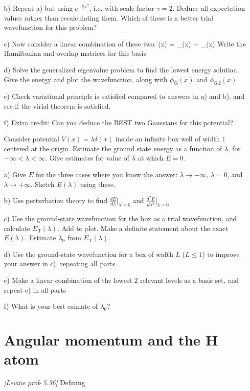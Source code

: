 b) Repeat a) but using $e^{-2x^2}$, i.e. with scale factor $\gamma = 2$. Deduce
all expectation values rather than recalculating them. Which of these is a better
trial wavefunction for this problem?

c) Now consider a linear combination of these two:
\be
   \phi(x) = \alpha\phi_{}(x) + \beta\phi_{}(x)
\ee
Write the Hamiltonian and overlap matrices for this basis

d) Solve the generalized eigenvalue problem to find the lowest energy solution. Give
the energy and plot the wavefunction, along with $\phi_{\text{G}}(x)$ and $\phi_{G\,2}(x)$

e) Check variational principle is satisfied compared to answers in a) and b), and see
if the virial theorem is satisfied.

f) Extra credit: Can you deduce the BEST two Gaussians for this potential?

\newpage
{}
Consider potential $V(x) = \lambda\delta(x)$ inside an infinite box well of width $1$ centered
at the origin. Estimate the ground state energy as a function of $\lambda$, for $-\infty < \lambda < \infty$.
Give estimates for value of $\lambda$ at which $E=0$.

a) Give $E$ for the three cases where you know the answer: $\lambda \rightarrow -\infty$,
$\lambda=0$, and $\lambda \rightarrow +\infty$. Sketch $E(\lambda)$ using these.

b) Use perturbation theory to find $\frac{dE}{d\lambda}\Bigg|_{\lambda=0}$ and $\frac{d^2E}{d\lambda^2}\Bigg|_{\lambda=0}$

c) Use the ground-state wavefunction for the box as a trial wavefunction, and calculate
$E_{\text{T}}(\lambda)$. Add to plot. Make a definite statement about the exact $E(\lambda)$.
Estimate $\lambda_0$ from $E_{\text{T}}(\lambda)$.

d) Use the ground-state wavefunction for a box of width $L$ ($L \leq 1$) to improve
your answer in c), repeating all parts.

e) Make a linear combination of the lowest 2 relevant levels as a basis set, and repeat
c) in all parts

f) What is your best esimate of $\lambda_0$?

\newpage
\part{Angular momentum and the H atom}
\newpage
{}
{\em [Levine prob 5.36]}
Defining


